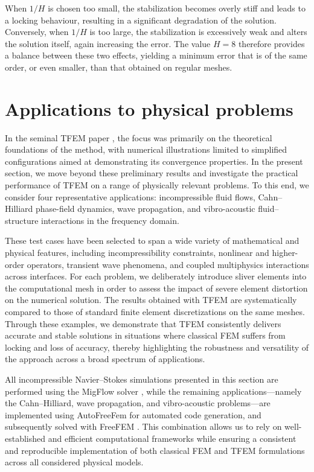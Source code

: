 \documentclass{article}
\begin{document}
When $1/H$ is chosen too small, the stabilization becomes overly stiff and
leads to a locking behaviour, resulting in a significant degradation of the
solution. Conversely, when $1/H$ is too large, the stabilization is excessively
weak and alters the solution itself, again increasing the error. The value
$H = 8$ therefore provides a balance between these two effects, yielding a
minimum error that is of the same order, or even smaller, than that obtained on regular meshes.

\section{Applications to physical problems}
\label{sec:physics}
In the seminal TFEM paper \cite{quiriny2024tempered}, the focus was primarily on the theoretical foundations of the method, with numerical illustrations limited to simplified configurations aimed at demonstrating its convergence properties. In the present section, we move beyond these preliminary results and investigate the practical performance of TFEM on a range of physically relevant problems. To this end, we consider four representative applications: incompressible fluid flows, Cahn–Hilliard phase-field dynamics, wave propagation, and vibro-acoustic fluid–structure interactions in the frequency domain.

These test cases have been selected to span a wide variety of mathematical and physical features, including incompressibility constraints, nonlinear and higher-order operators, transient wave phenomena, and coupled multiphysics interactions across interfaces. For each problem, we deliberately introduce sliver elements into the computational mesh in order to assess the impact of severe element distortion on the numerical solution. The results obtained with TFEM are systematically compared to those of standard finite element discretizations on the same meshes. Through these examples, we demonstrate that TFEM consistently delivers accurate and stable solutions in situations where classical FEM suffers from locking and loss of accuracy, thereby highlighting the robustness and versatility of the approach across a broad spectrum of applications. 

All incompressible Navier–Stokes simulations presented in this section are performed using the MigFlow solver \cite{CONSTANT2019213}, while the remaining applications—namely the Cahn–Hilliard, wave propagation, and vibro-acoustic problems—are implemented using AutoFreeFem \cite{Allaire2024} for automated code generation, and subsequently solved with FreeFEM \cite{MR3043640}. This combination allows us to rely on well-established and efficient computational frameworks while ensuring a consistent and reproducible implementation of both classical FEM and TFEM formulations across all considered physical models.
\end{document}
